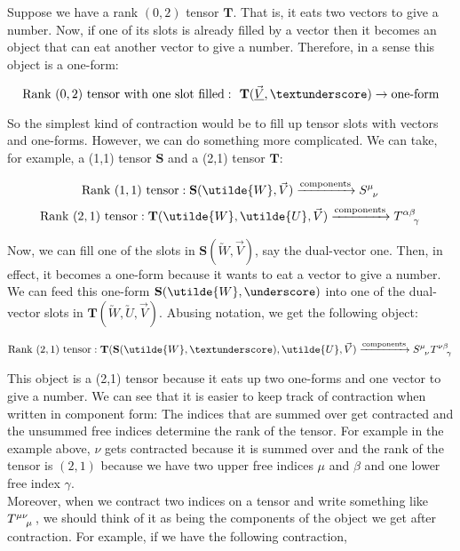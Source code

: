\documentclass[11pt]{article}
\begin{document}
Suppose we have a rank $(0,2)$ tensor $\textbf{T}$. That is, it eats two vectors to give a number. Now, if one of its slots is already filled by a vector then it becomes an object that can eat another vector to give a number. Therefore, in a sense this object is a one-form:

$$\text{Rank }(0,2) \text{ tensor with one slot filled}: \textbf{ T}(\underline{\vec{V}}, \textunderscore) \rightarrow \text{one-form}$$

So the simplest kind of contraction would be to fill up tensor slots with vectors and one-forms. However, we can do something more complicated. We can take, for example, a (1,1) tensor $\textbf{S}$ and a (2,1) tensor $\textbf{T}$:

$$\text{Rank }(1,1) \text{ tensor}: \textbf{S}({\utilde{W}},\vec{V})\xrightarrow{\text{components}} \tensor{S}{^\mu_\nu}$$
$$\text{Rank }(2,1) \text{ tensor}: \textbf{T}({\utilde{W}},\utilde{U},\vec{V})\xrightarrow{\text{components}} \tensor{T}{^\alpha^\beta_\gamma}$$

Now, we can fill one of the slots in $\textbf{S}({\utilde{W}},\vec{V})$, say the dual-vector one. Then, in effect, it becomes a one-form because it wants to eat a vector to give a number. We can feed this one-form $\textbf{S}({\utilde{W}},\underscore)$ into one of the dual-vector slots in $\textbf{T}({\utilde{W}},\utilde{U},\vec{V})$. Abusing notation, we get the following object:

$$\text{Rank }(2,1) \text{ tensor}: \textbf{T}({\textbf{S}({\utilde{W}},\textunderscore)},\utilde{U},\vec{V})\xrightarrow{\text{components}} \tensor{S}{^\mu_\nu}\tensor{T}{^\nu^\beta_\gamma}$$

This object is a (2,1) tensor because it eats up two one-forms and one vector to give a number. We can see that it is easier to keep track of contraction when written in component form: The indices that are summed over get contracted and the unsummed free indices determine the rank of the tensor. For example in the example above, $\nu$ gets contracted because it is summed over and the rank of the tensor is $(2,1)$ because we have two upper free indices $\mu$ and $\beta$ and one lower free index $\gamma$.\\

Moreover, when we contract two indices on a tensor and write something like $\tensor{T}{^\mu^\nu_\mu}$, we should think of it as being the components of the object we get after contraction. For example, if we have the following contraction,
\end{document}
